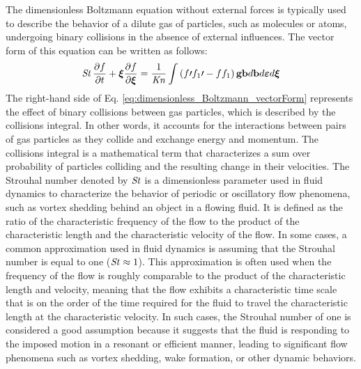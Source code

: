 The dimensionless Boltzmann equation without external forces is typically used to describe the behavior of a dilute gas of particles, such as molecules or atoms, undergoing binary collisions in the absence of external influences. The vector form of this equation can be written as follows\cite{kogan1969rarefied}:
\begin{equation} \label{eq:dimensionless_Boltzmann_vectorForm}
    \operatorname{\mathit{S\kern-.11em t}}\frac{\partial f}{\partial t} +\boldsymbol{\xi}\frac{\partial f}{\partial \boldsymbol{\xi}}
    =
    \frac{1}{\operatorname{\mathit{K\kern-.11em n}}}\int \left(f\prime f_1\prime-ff_1\right)\mathbf{g b}d\mathbf{b} d\boldsymbol{\varepsilon} d\boldsymbol{\xi}
\end{equation}
The right-hand side of Eq. \ref{eq:dimensionless_Boltzmann_vectorForm} represents the effect of binary collisions between gas particles, which is described by the collisions integral. In other words, it accounts for the interactions between pairs of gas particles as they collide and exchange energy and momentum. The collisions integral is a mathematical term that characterizes a sum over probability of particles colliding and the resulting change in their velocities. The Strouhal number denoted by $\operatorname{\mathit{S\kern-.11em t}}$ is a dimensionless parameter used in fluid dynamics to characterize the behavior of periodic or oscillatory flow phenomena, such as vortex shedding behind an object in a flowing fluid. It is defined as the ratio of the characteristic frequency of the flow to the product of the characteristic length and the characteristic velocity of the flow. In some cases, a common approximation used in fluid dynamics is assuming that the Strouhal number is equal to one ($\operatorname{\mathit{S\kern-.11em t}}\approx 1$). This approximation is often used when the frequency of the flow is roughly comparable to the product of the characteristic length and velocity, meaning that the flow exhibits a characteristic time scale that is on the order of the time required for the fluid to travel the characteristic length at the characteristic velocity. In such cases, the Strouhal number of one is considered a good assumption because it suggests that the fluid is responding to the imposed motion in a resonant or efficient manner, leading to significant flow phenomena such as vortex shedding, wake formation, or other dynamic behaviors.

